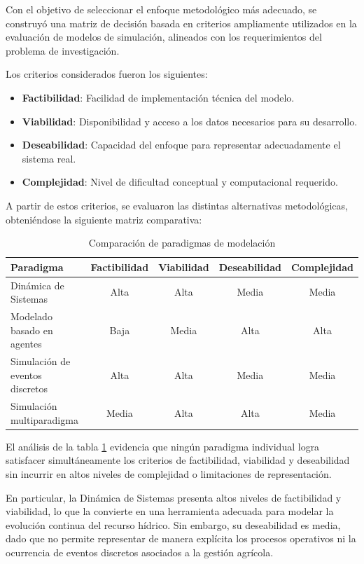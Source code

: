 \documentclass[12pt]{report}
\begin{document}
Con el objetivo de seleccionar el enfoque metodológico más adecuado, se construyó una matriz de decisión basada en criterios ampliamente utilizados en la evaluación de modelos de simulación, alineados con los requerimientos del problema de investigación.

Los criterios considerados fueron los siguientes:

\begin{itemize}
    \item \textbf{Factibilidad}: Facilidad de implementación técnica del modelo.
    \item \textbf{Viabilidad}: Disponibilidad y acceso a los datos necesarios para su desarrollo.
    \item \textbf{Deseabilidad}: Capacidad del enfoque para representar adecuadamente el sistema real.
    \item \textbf{Complejidad}: Nivel de dificultad conceptual y computacional requerido.
\end{itemize}

A partir de estos criterios, se evaluaron las distintas alternativas metodológicas, obteniéndose la siguiente matriz comparativa:

\begin{table}[H]
\centering
\begin{tabular}{lcccc}
\toprule
\textbf{Paradigma} & \textbf{Factibilidad} & \textbf{Viabilidad} & \textbf{Deseabilidad} & \textbf{Complejidad} \\
\midrule
Dinámica de Sistemas & Alta & Alta & Media & Media \\
Modelado basado en agentes & Baja & Media & Alta & Alta \\
Simulación de eventos discretos & Alta & Alta & Media & Media \\
Simulación multiparadigma & Media & Alta & Alta & Media \\
\bottomrule
\end{tabular}
\caption{Comparación de paradigmas de modelación}
\label{tab:paradigmas}
\end{table}

El análisis de la tabla \ref{tab:paradigmas} evidencia que ningún paradigma individual logra satisfacer simultáneamente los criterios de factibilidad, viabilidad y deseabilidad sin incurrir en altos niveles de complejidad o limitaciones de representación.

En particular, la Dinámica de Sistemas presenta altos niveles de factibilidad y viabilidad, lo que la convierte en una herramienta adecuada para modelar la evolución continua del recurso hídrico. Sin embargo, su deseabilidad es media, dado que no permite representar de manera explícita los procesos operativos ni la ocurrencia de eventos discretos asociados a la gestión agrícola.
\end{document}
